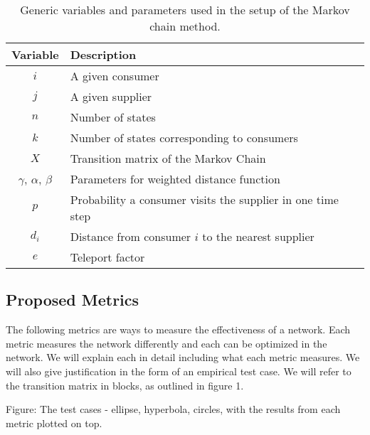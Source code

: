 \documentclass[twoside,twocolumn]{article}
\begin{document}
\begin{table}
\begin{tabular}{c | p{5cm}}
Variable & Description\\
\hline
$i$ & A given consumer\\
$j$ & A given supplier\\
$n$ & Number of states\\
$k$ & Number of states corresponding to consumers\\
$X$ & Transition matrix of the Markov Chain\\
$\gamma$, $\alpha$, $\beta$  & Parameters for weighted distance function\\
$p$ & Probability a consumer visits the supplier in one time step\\
$d_{i}$ & Distance from consumer $i$ to the nearest supplier\\
$e$ & Teleport factor
\end{tabular}
\caption{Generic variables and parameters used in the setup of the Markov chain method.}
\end{table}







\subsection{Proposed Metrics}
The following metrics are ways to measure the effectiveness of a network.
Each metric measures the network differently and each can be optimized in the network.
We will explain each in detail including what each metric measures.
We will also give justification in the form of an empirical test case. %
We will refer to the transition matrix in blocks, as outlined in figure 1.%


Figure: The test cases - ellipse, hyperbola, circles, with the results from each metric plotted on top.
\end{document}
